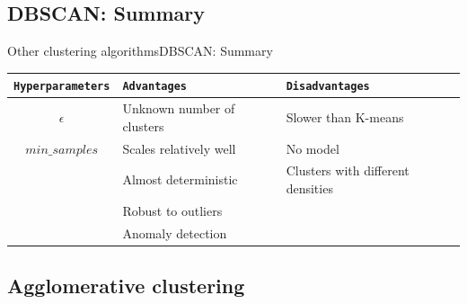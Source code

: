 \documentclass[10pt,compress]{beamer} %
\begin{document}
\subsection{DBSCAN: Summary}
\begin{frame}{Other clustering algorithms}{DBSCAN: Summary}
	\begin{center}
	\begin{tabular}{cp{3cm}p{3cm}}\hline
	 	\texttt{Hyperparameters}  & \texttt{Advantages}    & \texttt{Disadvantages} \\\hline
	 	$\epsilon$                & Unknown number of clusters  & Slower than K-means \\
	    $min\_samples$	          & Scales relatively well & No model \\
	                 	          & Almost deterministic   & Clusters with different densities \\
	                 	          & Robust to outliers     &  \\
	                 	          & Anomaly detection      &  \\
	 	\hline
	\end{tabular}
	\end{center}
\end{frame}

\subsection{Agglomerative clustering}
\end{document}
